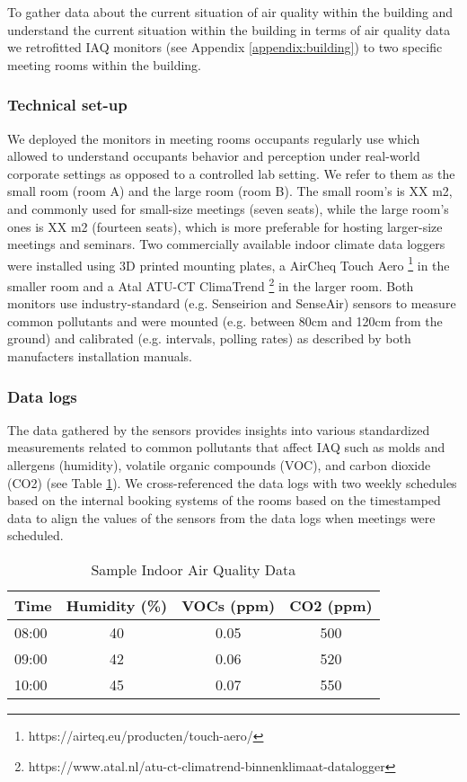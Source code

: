 To gather data about the current situation of air quality within the building and understand the current situation within the building in terms of air quality data we retrofitted IAQ monitors  (see Appendix \ref{appendix:building}) to two specific meeting rooms within the building.

\subsubsection{Technical set-up}

We deployed the monitors in meeting rooms occupants regularly use which allowed to understand occupants behavior and perception under real-world corporate settings as opposed to a controlled lab setting. We refer to them as the small room (room A) and the large room (room B). The small room’s is XX m2, and commonly used for small-size meetings (seven seats), while the large room’s ones is XX m2 (fourteen seats), which is more preferable for hosting larger-size meetings and seminars. Two commercially available indoor climate data loggers were installed using 3D printed mounting plates, a AirCheq Touch Aero \footnote{https://airteq.eu/producten/touch-aero/} in the smaller room and a Atal ATU-CT ClimaTrend \footnote{https://www.atal.nl/atu-ct-climatrend-binnenklimaat-datalogger} in the larger room. Both monitors use industry-standard (e.g. Senseirion and SenseAir) sensors to measure common pollutants and were mounted (e.g. between 80cm and 120cm from the ground) and calibrated (e.g. intervals, polling rates) as described by both manufacters installation manuals.

\subsubsection{Data logs}

The data gathered by the sensors provides insights into various standardized measurements related to common pollutants that affect IAQ such as molds and allergens (humidity), volatile organic compounds (VOC), and carbon dioxide (CO2) (see Table \ref{tab:air-quality}). We cross-referenced the data logs with two weekly schedules based on the internal booking systems of the rooms based on the timestamped data to align the values of the sensors from the data logs when meetings were scheduled.

\begin{table}[htbp]
    \centering
    \caption{Sample Indoor Air Quality Data}
    \begin{tabular}{lccc}
        \toprule
        \textbf{Time} & \textbf{Humidity (\%)} & \textbf{VOCs (ppm)} & \textbf{CO2 (ppm)} \\
        \midrule
        08:00 & 40 & 0.05 & 500 \\
        09:00 & 42 & 0.06 & 520 \\
        10:00 & 45 & 0.07 & 550 \\
        \bottomrule
    \end{tabular}
    \label{tab:air-quality}
\end{table}

